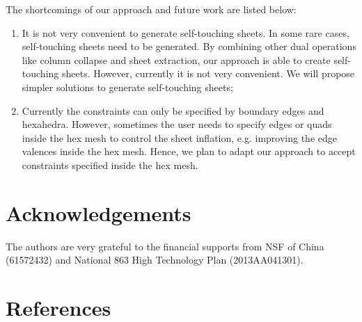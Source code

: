 \documentclass[final,5p,times,twocolumn]{elsarticle}
\begin{document}
The shortcomings of our approach and future work are listed below:
\begin{enumerate}
  \item It is not very convenient to generate self-touching sheets. In some rare cases, self-touching sheets need to be generated. By combining other dual operations like column collapse and sheet extraction, our approach is able to create self-touching sheets. However, currently it is not very convenient. We will propose simpler solutions to generate self-touching sheets;
  \item Currently the constraints can only be specified by boundary edges and hexahedra. However, sometimes the user needs to specify edges or quads inside the hex mesh to control the sheet inflation, e.g. improving the edge valences inside the hex mesh. Hence, we plan to adapt our approach to accept constraints specified inside the hex mesh.
\end{enumerate}

\section*{Acknowledgements}
The authors are very grateful to the financial supports from NSF of China (61572432) and National 863 High Technology Plan (2013AA041301).

\section*{References}


\end{document}
